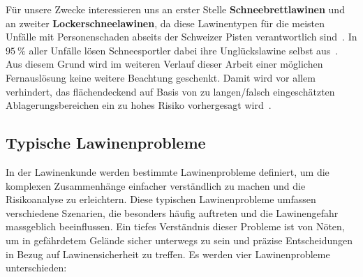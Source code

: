 Für unsere Zwecke interessieren uns an erster Stelle \textbf{Schneebrettlawinen} und an zweiter \textbf{Lockerschneelawinen}, da diese Lawinentypen für die meisten Unfälle mit Personenschaden abseits der Schweizer Pisten verantwortlich sind~\cite{harveyrhynerschweizerlawinenkunde}. In $\qty{95}{\percent}$ aller Unfälle lösen Schneesportler dabei ihre Unglückslawine selbst aus~\cite{ortovoxlabsnow}. Aus diesem Grund wird im weiteren Verlauf dieser Arbeit einer möglichen Fernauslösung keine weitere Beachtung geschenkt. Damit wird vor allem verhindert, das flächendeckend auf Basis von zu langen/falsch eingeschätzten Ablagerungsbereichen ein zu hohes Risiko vorhergesagt wird~\cite{athmaps}.


\subsection{Typische Lawinenprobleme}\label{lawinenprobleme}

In der Lawinenkunde werden bestimmte Lawinenprobleme definiert, um die komplexen Zusammenhänge einfacher verständlich zu machen und die Risikoanalyse zu erleichtern. Diese typischen Lawinenprobleme umfassen verschiedene Szenarien, die besonders häufig auftreten und die Lawinengefahr massgeblich beeinflussen. Ein tiefes Verständnis dieser Probleme ist von Nöten, um in gefährdetem Gelände sicher unterwegs zu sein und präzise Entscheidungen in Bezug auf Lawinensicherheit zu treffen. Es werden vier Lawinenprobleme unterschieden:

